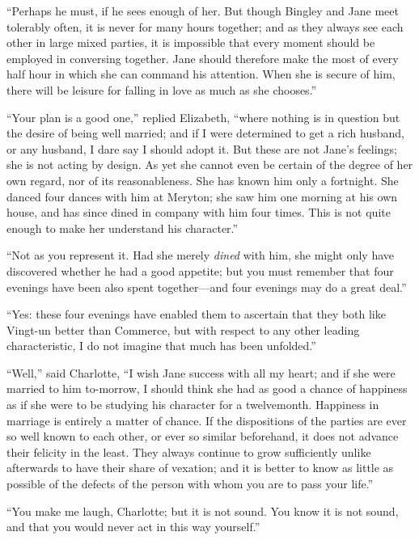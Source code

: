 ``Perhaps he must, if he sees enough of her. But though Bingley and Jane meet tolerably often, it is never for many hours together; and as they always see each other in large mixed parties, it is impossible that every moment should be employed in conversing together. Jane should therefore make the most of every half hour in which she can command his attention. When she is secure of him, there will be leisure for falling in love as much as she chooses.''

``Your plan is a good one,'' replied Elizabeth, ``where nothing is in question but the desire of being well married; and if I were determined to get a rich husband, or any husband, I dare say I should adopt it. But these are not Jane's feelings; she is not acting by design. As yet she cannot even be certain of the degree of her own regard, nor of its reasonableness. She has known him only a fortnight. She danced four dances with him at Meryton; she saw him one morning at his own house, and has since dined in company with him four times. This is not quite enough to make her understand his character.''

``Not as you represent it. Had she merely \textit{dined} with him, she might only have discovered whether he had a good appetite; but you must remember that four evenings have been also spent together---and four evenings may do a great deal.''

``Yes: these four evenings have enabled them to ascertain that they both like Vingt-un better than Commerce, but with respect to any other leading characteristic, I do not imagine that much has been unfolded.''

``Well,'' said Charlotte, ``I wish Jane success with all my heart; and if she were married to him to-morrow, I should think she had as good a chance of happiness as if she were to be studying his character for a twelvemonth. Happiness in marriage is entirely a matter of chance. If the dispositions of the parties are ever so well known to each other, or ever so similar beforehand, it does not advance their felicity in the least. They always continue to grow sufficiently unlike afterwards to have their share of vexation; and it is better to know as little as possible of the defects of the person with whom you are to pass your life.''

``You make me laugh, Charlotte; but it is not sound. You know it is not sound, and that you would never act in this way yourself.''

